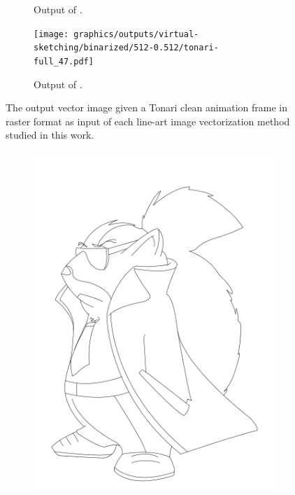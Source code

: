 \begin{figure}[h]
\begin{subfigure}{.49\textwidth}
    \caption{Output of \citet{Puhachov2021KeypointPolyvector}.}
    \end{subfigure}
    \begin{subfigure}{.49\textwidth}
    \texttt{[image: graphics/outputs/virtual-sketching/binarized/512-0.512/tonari-full\_47.pdf]}
    \caption{Output of \citet{mo2021virtualsketching}.}
    \end{subfigure}
    \caption{The output vector image given a Tonari clean animation frame in raster format as input of each line-art image vectorization method studied in this work.}
    \label{fig:tonari-full_47_full_comparison}
\end{figure}


\begin{figure}[h]
    \centering
    \begin{subfigure}{.3\textwidth}
    \includegraphics[width=\textwidth]{graphics/outputs/ground-truth/sketchbench-black_Art_freeform_AP_02_Santiago Rial_norm_cleaned.png}

\end{subfigure}
\end{figure}
